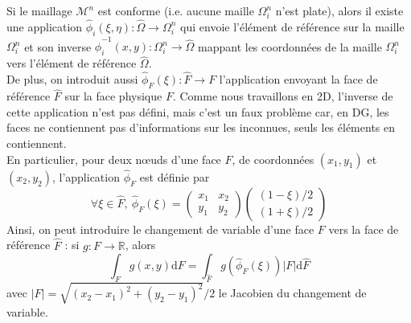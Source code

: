 \documentclass[11pt, a4paper, oneside]{report}
\begin{document}
Si le maillage $\mathcal{M}^n$ est conforme (i.e. aucune maille $\Omega_i^n$ n'est plate), alors il existe une application $\widehat{\phi}_i(\xi, \eta) : \widehat{\Omega} \longrightarrow \Omega_i^n$ qui envoie l'élément de référence sur la maille $\Omega_i^n$ et son inverse $\widehat{\phi}_i^{-1}(x, y) : \Omega_i^n \longrightarrow \widehat{\Omega}$ mappant les coordonnées de la maille $\Omega_i^n$ vers l'élément de référence $\widehat{\Omega}$. \\
De plus, on introduit aussi $\widehat{\phi}_F(\xi) : \widehat{F} \longrightarrow F$ l'application envoyant la face de référence $\widehat{F}$ sur la face physique $F$. Comme nous travaillons en 2D, l'inverse de cette application n'est pas défini, mais c'est un faux problème car, en DG, les faces ne contiennent pas d'informations sur les inconnues, seuls les éléments en contiennent. \\
En particulier, pour deux nœuds d'une face $F$, de coordonnées $(x_1, y_1)$ et $(x_2, y_2)$, l'application $\widehat{\phi}_F$ est définie par
\begin{equation}
    \forall \xi \in \widehat{F}, ~ \widehat{\phi}_F(\xi) = \begin{pmatrix} x_1 & x_2 \\ y_1 & y_2 \end{pmatrix} \begin{pmatrix} (1 - \xi)/2 \\ (1 + \xi)/2 \end{pmatrix}
\end{equation}
Ainsi, on peut introduire le changement de variable d'une face $F$ vers la face de référence $\widehat{F}$ : si $g : F \longrightarrow \mathbb{R}$, alors
\begin{equation}
    \int_F g(x, y) \text{d}F = \int_{\widehat{F}} g(\widehat{\phi}_F(\xi)) \lvert F \rvert \text{d}\widehat{F}
\end{equation}
avec $\lvert F \rvert = \sqrt{(x_2 - x_1)^2 + (y_2 - y_1)^2}/2$ le Jacobien du changement de variable.
\end{document}
